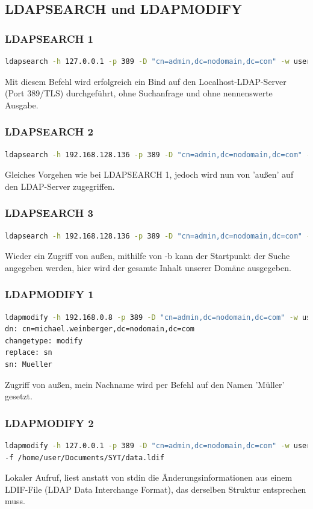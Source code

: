\documentclass[letterpaper, 12pt]{article}
\let\tempsubsection\subsection
\renewcommand\subsection[1]{\vspace{0cm}\tempsubsection{#1}\vspace{0cm}}
\let\tempsubsubsection\subsubsection
\renewcommand\subsubsection[1]{\vspace{0cm}\tempsubsubsection{#1}\vspace{0cm}}
\begin{document}
\subsection{LDAPSEARCH und LDAPMODIFY}
\subsubsection{LDAPSEARCH 1}
\begin{lstlisting}[frame=single, language=bash, caption=1.Befehl]
ldapsearch -h 127.0.0.1 -p 389 -D "cn=admin,dc=nodomain,dc=com" -w user
\end{lstlisting} 
Mit diesem Befehl wird erfolgreich ein Bind auf den Localhost-LDAP-Server (Port 389/TLS) durchgeführt, ohne Suchanfrage und ohne nennenswerte Ausgabe.
\subsubsection{LDAPSEARCH 2}
\begin{lstlisting}[frame=single, language=bash, caption=2.Befehl]
ldapsearch -h 192.168.128.136 -p 389 -D "cn=admin,dc=nodomain,dc=com" -w user
\end{lstlisting} 
Gleiches Vorgehen wie bei LDAPSEARCH 1, jedoch wird nun von 'außen' auf den LDAP-Server zugegriffen.
\subsubsection{LDAPSEARCH 3}
\begin{lstlisting}[frame=single, language=bash, caption=3.Befehl]
ldapsearch -h 192.168.128.136 -p 389 -D "cn=admin,dc=nodomain,dc=com" -w user -b "dc=nodomain,dc=com"
\end{lstlisting} 
Wieder ein Zugriff von außen, mithilfe von -b kann der Startpunkt der Suche angegeben werden, hier wird der gesamte Inhalt unserer Domäne ausgegeben.
\subsubsection{LDAPMODIFY 1}
\begin{lstlisting}[frame=single, language=bash, caption=4.Befehl]
ldapmodify -h 192.168.0.8 -p 389 -D "cn=admin,dc=nodomain,dc=com" -w user
dn: cn=michael.weinberger,dc=nodomain,dc=com
changetype: modify
replace: sn
sn: Mueller
\end{lstlisting} 
Zugriff von außen, mein Nachname wird per Befehl auf den Namen 'Müller' gesetzt.
\subsubsection{LDAPMODIFY 2}
\begin{lstlisting}[frame=single, language=bash, caption=5.Befehl]
ldapmodify -h 127.0.0.1 -p 389 -D "cn=admin,dc=nodomain,dc=com" -w user 
-f /home/user/Documents/SYT/data.ldif
\end{lstlisting} 
Lokaler Aufruf, liest anstatt von stdin die Änderungsinformationen aus einem LDIF-File (LDAP Data Interchange Format), das derselben Struktur entsprechen muss.
\newpage





\lstlistoflistings
\listoffigures
\end{document}
